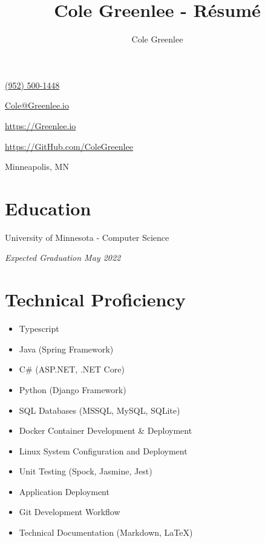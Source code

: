 \documentclass{article}
\title{Cole Greenlee - R\'esum\'e}
\author{Cole Greenlee}
\renewcommand{\maketitle}{
{\huge\bfseries\theauthor}
}
\begin{document}
\selectfont
\begin{multicols}{2}
	\begin{description}
		\item\maketitle
		\item\href{tel:+19525001448}{(952) 500-1448}
		\item\href{mailto:Cole@Greenlee.io}{Cole@Greenlee.io}
		\begin{flushright}
			\vspace{-1.5em}
			\item\href{https://Greenlee.io}{https://Greenlee.io}
			\item\href{https://GitHub.com/ColeGreenlee/}{https://GitHub.com/ColeGreenlee}
			\item Minneapolis, MN
		\end{flushright}
	\end{description}
\end{multicols}

\section{Education}
\vspace{-1.5em}
\begin{multicols}{2}
	\begin{flushleft}
		University of Minnesota - Computer Science
	\end{flushleft}
	\begin{flushright}
		\textit{Expected Graduation May 2022}
	\end{flushright}
\end{multicols}

\section{Technical Proficiency}
\vspace{-1.5em}
\begin{multicols}{2}
	\begin{itemize}[leftmargin=*]
		\item Typescript
		\item Java (Spring Framework)
		\item C\# (ASP.NET, .NET Core)
		\item Python (Django Framework)
		\item SQL Databases (MSSQL, MySQL, SQLite)
		\item Docker Container Development \& Deployment
		\item Linux System Configuration and Deployment
		\item Unit Testing (Spock, Jasmine, Jest)
		\item Application Deployment
		\item Git Development Workflow
		\item Technical Documentation (Markdown, LaTeX)
	\end{itemize}
\end{multicols}
\end{document}
